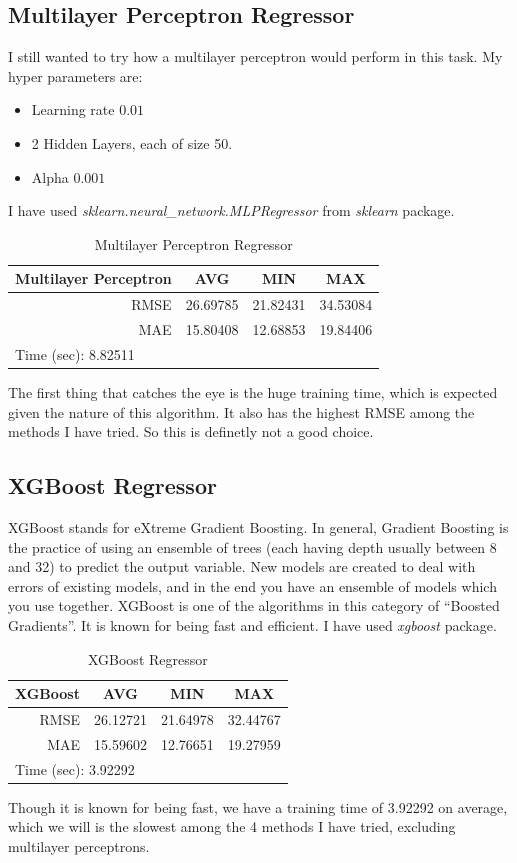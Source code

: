\documentclass[11pt,reqno]{amsart}
\begin{document}
\subsection{Multilayer Perceptron Regressor}
I still wanted to try how a multilayer perceptron would perform in this task. My hyper parameters are:
\begin{itemize}
	\item Learning rate $0.01$
	\item 2 Hidden Layers, each of size 50.
	\item Alpha $0.001$
\end{itemize}
I have used \textit{sklearn.neural\_network.MLPRegressor} from \textit{sklearn} package.
\begin{table}[]
\begin{tabular}{|c|l|l|l|}
\hline
Multilayer Perceptron & \multicolumn{1}{c|}{AVG} & \multicolumn{1}{c|}{MIN} & \multicolumn{1}{c|}{MAX} \\ \hline
\multicolumn{1}{|r|}{RMSE} & 26.69785 & 21.82431 & 34.53084 \\ \hline
\multicolumn{1}{|r|}{MAE} & 15.80408 & 12.68853 & 19.84406 \\ \hline
\multicolumn{4}{|l|}{Time (sec): 8.82511} \\ \hline
\end{tabular}
\caption{Multilayer Perceptron Regressor}
\label{tab:mlp}
\end{table}
The first thing that catches the eye is the huge training time, which is expected given the nature of this algorithm. It also has the highest RMSE among the methods I have tried. So this is definetly not a good choice.

\subsection{XGBoost Regressor}
XGBoost stands for eXtreme Gradient Boosting. In general, Gradient Boosting is the practice of using an ensemble of trees (each having depth usually between 8 and 32) to predict the output variable. New models are created to deal with errors of existing models, and in the end you have an ensemble of models which you use together. XGBoost is one of the algorithms in this category of ``Boosted Gradients''. It is known for being fast and efficient. I have used \textit{xgboost} package.
\begin{table}[]
\begin{tabular}{|c|l|l|l|}
\hline
XGBoost & \multicolumn{1}{c|}{AVG} & \multicolumn{1}{c|}{MIN} & \multicolumn{1}{c|}{MAX} \\ \hline
\multicolumn{1}{|r|}{RMSE} & 26.12721 & 21.64978 & 32.44767 \\ \hline
\multicolumn{1}{|r|}{MAE} & 15.59602 & 12.76651 & 19.27959 \\ \hline
\multicolumn{4}{|l|}{Time (sec): 3.92292} \\ \hline
\end{tabular}
\caption{XGBoost Regressor}
\label{tab:xgboost}
\end{table}
Though it is known for being fast, we have a training time of 3.92292 on average, which we will is the slowest among the 4 methods I have tried, excluding multilayer perceptrons.
\end{document}
